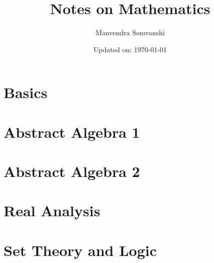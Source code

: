 \documentclass[11pt,a4paper]{colorart}
\numberwithin{equation}{section}
\begin{document}
\title{\Huge Notes on Mathematics}
\author{Manvendra Somvanshi} 
\date{Updated on: \today} 
\maketitle
\tableofcontents
\newpage
\part{Basics}




\newpage
\part{Abstract Algebra \rm{1}}









\newpage
\part{Abstract Algebra \rm{2}}




\newpage
\part{Real Analysis}







\newpage
\part{Set Theory and Logic}



\newpage
\end{document}
